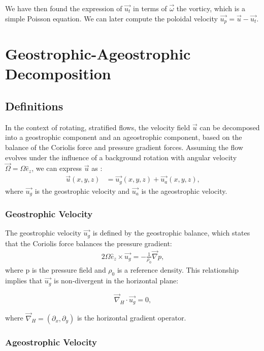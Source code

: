 We have then found the expression of $\vec{u_t}$ in terms of $\vec{\omega}$ the vorticy, which is a simple Poisson equation. We can later compute the poloidal velocity $\vec{u_p} = \vec{u} - \vec{u_t}$.


\section{Geostrophic-Ageostrophic Decomposition}
\subsection{Definitions}

In the context of rotating, stratified flows, the velocity field $\vec{u}$ can be decomposed into a geostrophic component and an ageostrophic component, based on the balance of the Coriolis force and pressure gradient forces. Assuming the flow evolves under the influence of a background rotation with angular velocity $\vec{\Omega} = \Omega \hat{e}_z$, we can express $\vec{u}$ as \cite{holton_introduction_2012}:
\begin{align}
	\vec{u}(x,y,z) &= \vec{u_g}(x,y,z) + \vec{u_a}(x,y,z),
\end{align}
where $\vec{u_g}$ is the geostrophic velocity and $\vec{u_a}$ is the ageostrophic velocity.

\subsubsection{Geostrophic Velocity}

The geostrophic velocity $\vec{u_g}$ is defined by the geostrophic balance, which states that the Coriolis force balances the pressure gradient:
\begin{align}
	2\Omega \hat{e}_z \times \vec{u_g} = -\frac{1}{\rho_0} \vec{\nabla} p,
\end{align}
where p is the pressure field and $\rho_0$ is a reference density. This relationship implies that $\vec{u_g}$ is non-divergent in the horizontal plane:

\begin{equation*}
	\vec{\nabla}_H \cdot \vec{u_g} = 0,
\end{equation*}

where $\vec{\nabla}_H = (\partial_x, \partial_y)$ is the horizontal gradient operator.

\subsubsection{Ageostrophic Velocity}

